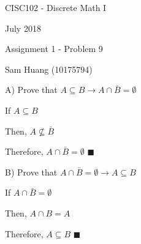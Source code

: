 \documentclass{report}
\begin{document}
    CISC102 - Discrete Math I

    July 2018

    \bigskip
    
    Assignment 1 - Problem 9
    
    Sam Huang (10175794)
    \bigskip
    
    A) Prove that $A \subseteq B \rightarrow A \cap \bar{B} = \emptyset$
    
    If $A \subseteq B$
    
    Then, $A \not\subseteq \bar{B}$
    
    Therefore, $A \cap \bar{B} = \emptyset$
    $\blacksquare$
    
    \medskip
    
    B) Prove that $A \cap \bar{B} = \emptyset \rightarrow A \subseteq B$
    
    If $A \cap \bar{B} = \emptyset$
    
    Then, $A \cap B = A$
    
    Therefore, $A \subseteq B$
    $\blacksquare$
    
    
\end{document}
